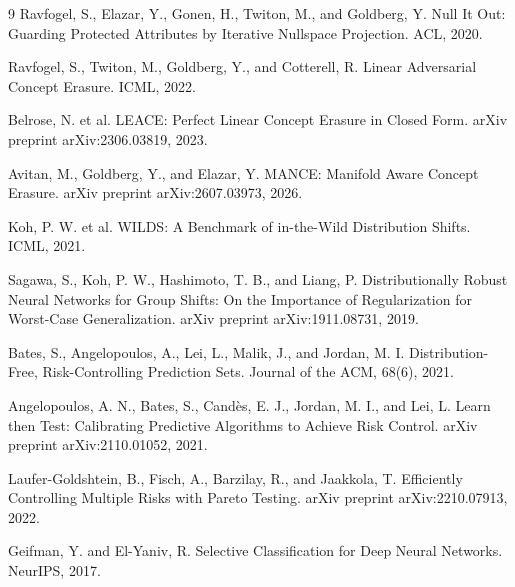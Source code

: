 \documentclass[10pt]{article}
\begin{document}
\begin{thebibliography}{9}
Ravfogel, S., Elazar, Y., Gonen, H., Twiton, M., and Goldberg, Y. Null It Out:
Guarding Protected Attributes by Iterative Nullspace Projection. ACL, 2020.

Ravfogel, S., Twiton, M., Goldberg, Y., and Cotterell, R. Linear Adversarial
Concept Erasure. ICML, 2022.

Belrose, N. et al. LEACE: Perfect Linear Concept Erasure in Closed Form. arXiv
preprint arXiv:2306.03819, 2023.

Avitan, M., Goldberg, Y., and Elazar, Y. MANCE: Manifold Aware Concept Erasure.
arXiv preprint arXiv:2607.03973, 2026.

Koh, P. W. et al. WILDS: A Benchmark of in-the-Wild Distribution Shifts. ICML,
2021.

Sagawa, S., Koh, P. W., Hashimoto, T. B., and Liang, P. Distributionally Robust
Neural Networks for Group Shifts: On the Importance of Regularization for
Worst-Case Generalization. arXiv preprint arXiv:1911.08731, 2019.

Bates, S., Angelopoulos, A., Lei, L., Malik, J., and Jordan, M. I.
Distribution-Free, Risk-Controlling Prediction Sets. Journal of the ACM,
68(6), 2021.

Angelopoulos, A. N., Bates, S., Cand\`es, E. J., Jordan, M. I., and Lei, L.
Learn then Test: Calibrating Predictive Algorithms to Achieve Risk Control.
arXiv preprint arXiv:2110.01052, 2021.

Laufer-Goldshtein, B., Fisch, A., Barzilay, R., and Jaakkola, T. Efficiently
Controlling Multiple Risks with Pareto Testing. arXiv preprint
arXiv:2210.07913, 2022.

Geifman, Y. and El-Yaniv, R. Selective Classification for Deep Neural
Networks. NeurIPS, 2017.
\end{thebibliography}
\end{document}
